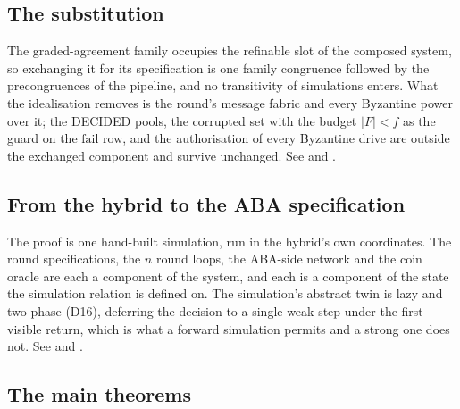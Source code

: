 

\subsection{The substitution}

The graded-agreement family occupies the refinable slot of the composed system, so exchanging it for its specification is one family congruence followed by the precongruences of the pipeline, and no transitivity of simulations enters.
What the idealisation removes is the round's message fabric and every Byzantine power over it; the DECIDED pools, the corrupted set with the budget $|F| < f$ as the guard on the $\mathrm{fail}$ row, and the authorisation of every Byzantine drive are outside the exchanged component and survive unchanged.
See  and .





\subsection{From the hybrid to the ABA specification}

The proof is one hand-built simulation, run in the hybrid's own coordinates.
The round specifications, the $n$ round loops, the ABA-side network and the coin oracle are each a component of the system, and each is a component of the state the simulation relation is defined on.
The simulation's abstract twin is lazy and two-phase (D16), deferring the decision to a single weak step under the first visible return, which is what a forward simulation permits and a strong one does not.
See  and .




\subsection{The main theorems}

